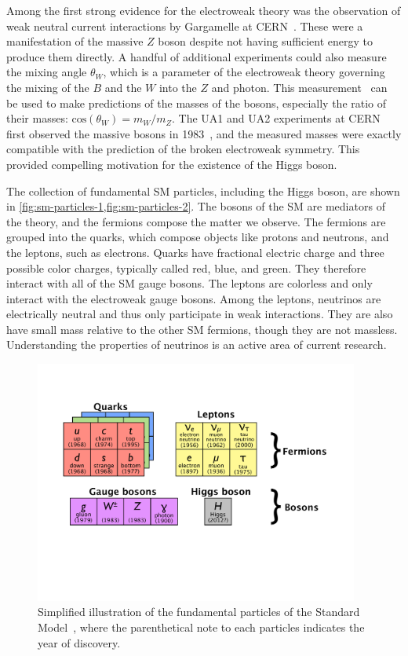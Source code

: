 Among the first strong evidence for the electroweak theory was the observation of weak neutral current interactions by Gargamelle at CERN~\cite{1973.gargamelle-1,1973.gargamelle-2,1973.gargamelle-3}. These were a manifestation of the massive $Z$ boson despite not having sufficient energy to produce them directly. A handful of additional experiments could also measure the mixing angle $\theta_W$, which is a parameter of the electroweak theory governing the mixing of the $B$ and the $W$ into the $Z$ and photon. This measurement~\cite{1981.weinberg-angle-1,1981.weinberg-angle-2} can be used to make predictions of the masses of the bosons, especially the ratio of their masses: $\text{cos}(\theta_W) = m_W/m_Z$. The UA1 and UA2 experiments at CERN first observed the massive bosons in 1983~\cite{1983.UA1.discovery-of-W,1983.UA1.discovery-of-Z,1983.UA2.discovery-of-W,1983.UA2.discovery-of-Z}, and the measured masses were exactly compatible with the prediction of the broken electroweak symmetry. This provided compelling motivation for the existence of the Higgs boson.

The collection of fundamental SM particles, including the Higgs boson, are shown in \cref{fig:sm-particles-1,fig:sm-particles-2}. The bosons of the SM are mediators of the theory, and the fermions compose the matter we observe. The fermions are grouped into the quarks, which compose objects like protons and neutrons, and the leptons, such as electrons. Quarks have fractional electric charge and three possible color charges, typically called red, blue, and green. They therefore interact with all of the SM gauge bosons. The leptons are colorless and only interact with the electroweak gauge bosons. Among the leptons, neutrinos are electrically neutral and thus only participate in weak interactions. They are also have small mass relative to the other SM fermions, though they are not massless. Understanding the properties of neutrinos is an active area of current research.

\begin{figure}[tp]
  \centering
  \includegraphics[width=0.95\textwidth]{figures/standardmodel/sm-content-2}
  \caption{Simplified illustration of the fundamental particles of the Standard Model~\cite{2013.thesis.ryan}, where the parenthetical note to each particles indicates the year of discovery.}
  \label{fig:sm-particles-1}
\end{figure}

